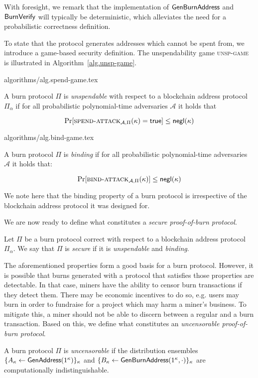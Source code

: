 With foresight, we remark that the implementation of $\mathsf{GenBurnAddress}$ and $\mathsf{BurnVerify}$ will typically be deterministic, which alleviates the need for a probabilistic correctness definition.

To state that the protocol generates addresses which cannot be spent from, we introduce a game-based security definition. The unspendability game \textsc{unsp-game} is illustrated in Algorithm~\ref{alg.unsp-game}.

{algorithms/alg.spend-game.tex}

\begin{definition}[Unspendability]
  A burn protocol $\Pi$ is \emph{unspendable} with respect to a blockchain address protocol $\Pi_\alpha$ if
  for all probabilistic polynomial-time adversaries $\mathcal{A}$
  it holds that

  \[
    \Pr[\textsc{spend-attack}_{\mathcal{A},
    \Pi}(\kappa) = \textsf{true}] \leq \textsf{negl}(\kappa)
  \]
\end{definition}

{algorithms/alg.bind-game.tex}

\begin{definition}[Binding]
  A burn protocol $\Pi$ is \emph{binding} if
  for all probabilistic polynomial-time adversaries $\mathcal{A}$ it holds that:

  \[
    \Pr[\textsc{bind-attack}_{\mathcal{A},\Pi}(\kappa)] \leq \textsf{negl}(\kappa)
  \]
\end{definition}

We note here that the binding property of a burn protocol is irrespective of the blockchain address protocol it was designed for.

We are now ready to define what constitutes a \emph{secure proof-of-burn protocol}.

\begin{definition}[Security]
  Let $\Pi$ be a burn protocol correct with respect to a blockchain address protocol $\Pi_\alpha$. We say that $\Pi$ is \emph{secure} if it is \emph{unspendable} and \emph{binding}.
\end{definition}

The aforementioned properties form a good basis for a burn protocol. However, it is possible that burns generated with a protocol that satisfies those properties are detectable. In that case, miners have the ability to censor burn transactions if they detect them. There may be economic incentives to do so, e.g. users may burn in order to fundraise for a project which may harm a miner's business. To mitigate this, a miner should not be able to discern between a regular and a burn transaction. Based on this, we define what constitutes an \emph{uncensorable proof-of-burn protocol}.

\begin{definition}[Uncensorability]
  A burn protocol $\Pi$ is \emph{uncensorable} if
  the distribution ensembles $\{A_\kappa \gets \mathsf{GenAddress}(1^\kappa)\}_\kappa$ and
  $\{B_\kappa \gets \mathsf{GenBurnAddress}(1^\kappa, \cdot)\}_\kappa$ are computationally indistinguishable.
\end{definition}
